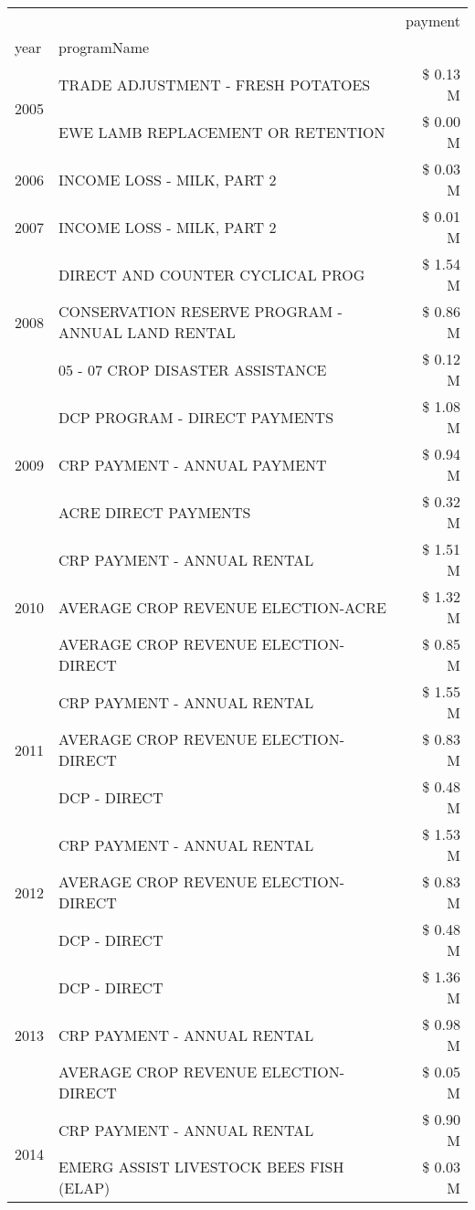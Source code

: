 \begin{tabular}{llr}
\toprule
 &  & payment \\
year & programName &  \\
\midrule
\multirow[t]{2}{*}{2005} & TRADE ADJUSTMENT - FRESH POTATOES & \$ 0.13 M \\
 & EWE LAMB REPLACEMENT OR RETENTION & \$ 0.00 M \\
\cline{1-3}
2006 & INCOME LOSS - MILK, PART 2 & \$ 0.03 M \\
\cline{1-3}
2007 & INCOME LOSS - MILK, PART 2 & \$ 0.01 M \\
\cline{1-3}
\multirow[t]{3}{*}{2008} & DIRECT AND COUNTER CYCLICAL PROG & \$ 1.54 M \\
 & CONSERVATION RESERVE PROGRAM - ANNUAL LAND RENTAL & \$ 0.86 M \\
 & 05 - 07 CROP DISASTER ASSISTANCE & \$ 0.12 M \\
\cline{1-3}
\multirow[t]{3}{*}{2009} & DCP PROGRAM - DIRECT PAYMENTS & \$ 1.08 M \\
 & CRP PAYMENT - ANNUAL PAYMENT & \$ 0.94 M \\
 & ACRE DIRECT PAYMENTS & \$ 0.32 M \\
\cline{1-3}
\multirow[t]{3}{*}{2010} & CRP PAYMENT - ANNUAL RENTAL & \$ 1.51 M \\
 & AVERAGE CROP REVENUE ELECTION-ACRE & \$ 1.32 M \\
 & AVERAGE CROP REVENUE ELECTION-DIRECT & \$ 0.85 M \\
\cline{1-3}
\multirow[t]{3}{*}{2011} & CRP PAYMENT - ANNUAL RENTAL & \$ 1.55 M \\
 & AVERAGE CROP REVENUE ELECTION-DIRECT & \$ 0.83 M \\
 & DCP - DIRECT & \$ 0.48 M \\
\cline{1-3}
\multirow[t]{3}{*}{2012} & CRP PAYMENT - ANNUAL RENTAL & \$ 1.53 M \\
 & AVERAGE CROP REVENUE ELECTION-DIRECT & \$ 0.83 M \\
 & DCP - DIRECT & \$ 0.48 M \\
\cline{1-3}
\multirow[t]{3}{*}{2013} & DCP - DIRECT & \$ 1.36 M \\
 & CRP PAYMENT - ANNUAL RENTAL & \$ 0.98 M \\
 & AVERAGE CROP REVENUE ELECTION-DIRECT & \$ 0.05 M \\
\cline{1-3}
\multirow[t]{3}{*}{2014} & CRP PAYMENT - ANNUAL RENTAL & \$ 0.90 M \\
 & EMERG ASSIST LIVESTOCK BEES FISH (ELAP) & \$ 0.03 M \\

\end{tabular}
